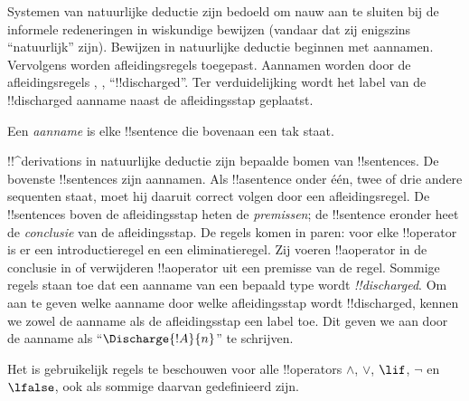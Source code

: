 \documentclass[../../../include/open-logic-section]{subfiles}
\begin{document}
      {}
      {}


\begin{explain}
Systemen van natuurlijke deductie zijn bedoeld om nauw aan te sluiten
bij de informele redeneringen in wiskundige bewijzen (vandaar dat zij
enigszins ``natuurlijk'' zijn). Bewijzen in natuurlijke deductie
beginnen met aannamen. Vervolgens worden afleidingsregels toegepast.
Aannamen worden door de afleidingsregels \Intro{\lnot}, \Intro{\lif},
``!!{discharged}''. Ter verduidelijking wordt het label van de
!!{discharged} aanname naast de afleidingsstap geplaatst.
\end{explain}

\begin{defn}[Aanname]
Een \emph{aanname} is elke !!{sentence} die bovenaan een tak staat.
\end{defn}

!!^{derivation}s in natuurlijke deductie zijn bepaalde bomen van
!!{sentence}s. De bovenste !!{sentence}s zijn aannamen. Als
!!a{sentence} onder één, twee of drie andere sequenten staat, moet hij
daaruit correct volgen door een afleidingsregel. De !!{sentence}s
boven de afleidingsstap heten de \emph{premissen}; de !!{sentence}
eronder heet de \emph{conclusie} van de afleidingsstap. De regels komen
in paren: voor elke !!{operator} is er een introductieregel en een
eliminatieregel. Zij voeren !!a{operator} in de conclusie in of
verwijderen !!a{operator} uit een premisse van de regel. Sommige regels
staan toe dat een aanname van een bepaald type wordt
\emph{!!{discharged}}. Om aan te geven welke aanname door welke
afleidingsstap wordt !!{discharged}, kennen we zowel de aanname als de
afleidingsstap een label toe. Dit geven we aan door de aanname als
``$\Discharge{!A}{n}$'' te schrijven.


%
	{Het is gebruikelijk regels te beschouwen voor alle !!{operator}s $\land$, $\lor$, $\lif$, $\lnot$ en $\lfalse$, ook als sommige daarvan gedefinieerd zijn.}
\end{document}
